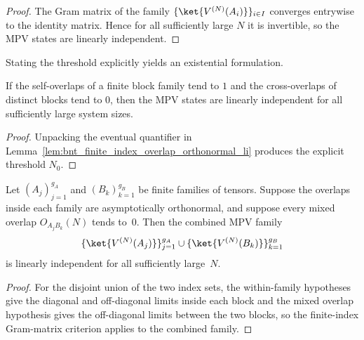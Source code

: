\begin{proof}\leanok
    The Gram matrix of the family $\{\ket{V^{(N)}(A_i)}\}_{i \in I}$
    converges entrywise to the identity matrix. Hence for all sufficiently
    large $N$ it is invertible, so the MPV states are linearly independent.
\end{proof}

Stating the threshold explicitly yields an existential formulation.

\begin{lemma}%
    \label{thm:bnt_li_from_overlap_limits_exists}
    \leanok
    If the self-overlaps of a finite block family tend to $1$ and the
    cross-overlaps of distinct blocks tend to $0$, then the MPV states are
    linearly independent for all sufficiently large system sizes.
\end{lemma}

\begin{proof}\leanok
    Unpacking the eventual quantifier in
    Lemma~\ref{lem:bnt_finite_index_overlap_orthonormal_li} produces the
    explicit threshold $N_0$.
\end{proof}

\begin{lemma}%
    \label{lem:bnt_two_family_overlap_orthonormal_li}
    \leanok
    Let $(A_j)_{j=1}^{g_A}$ and $(B_k)_{k=1}^{g_B}$ be finite families of
    tensors. Suppose the overlaps inside each family are asymptotically
    orthonormal, and suppose every mixed overlap
    $O_{A_jB_k}(N)$ tends to~$0$. Then the combined MPV family
    \begin{align}
        \{\ket{V^{(N)}(A_j)}\}_{j=1}^{g_A}
        \cup
        \{\ket{V^{(N)}(B_k)}\}_{k=1}^{g_B}
        \notag
    \end{align}
    is linearly independent for all sufficiently large~$N$.
\end{lemma}

\begin{proof}\leanok
    For the disjoint union of the two index sets, the within-family hypotheses
    give the diagonal and off-diagonal limits inside each block and the mixed
    overlap hypothesis gives the off-diagonal limits between the two blocks, so
    the finite-index Gram-matrix criterion applies to the combined family.
\end{proof}

